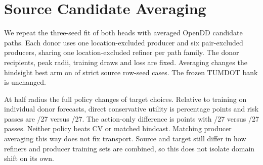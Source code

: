 \section{Source Candidate Averaging}
We repeat the three-seed fit of both heads with averaged OpenDD
candidate paths. Each donor uses one location-excluded producer and
six pair-excluded producers, sharing one location-excluded refiner
per path family. The donor recipients, peak radii, training draws and
loss are fixed. Averaging changes the hindsight best arm on
\SourceEnsembleDonorChanged{} of \SourceEnsembleDonorStrict{} strict
source row-seed cases. The frozen TUMDOT bank is unchanged.

At half radius the full policy changes \SourceEnsembleChanged{} of
\SourceEnsembleRows{} target choices. Relative to training on individual
donor forecasts, direct conservative utility is \SourceEnsembleFull{}
percentage points and risk passes are \SourceEnsembleFullEns/27 versus
\SourceEnsembleFullSingle/27. The action-only difference is
\SourceEnsembleSmall{} points with \SourceEnsembleSmallEns/27 versus
\SourceEnsembleSmallSingle/27 passes. Neither policy beats CV or matched
hindcast. Matching producer averaging this way does not fix transport.
Source and target still differ in how refiners and producer training
sets are combined, so this does not isolate domain shift on its own.
